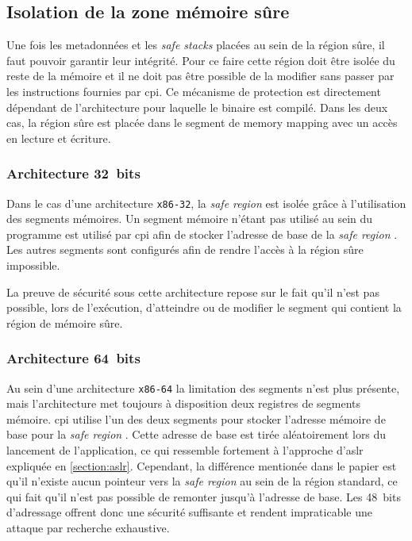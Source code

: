 \subsection{Isolation de la zone mémoire sûre}

Une fois les metadonnées et les \og \textit{safe stacks} \fg placées au sein de la région sûre, il faut pouvoir garantir leur intégrité. Pour ce faire cette région doit être isolée du reste de la mémoire et il ne doit pas être possible de la modifier sans passer par les instructions fournies par \gls{cpi}. Ce mécanisme de protection est directement dépendant de l'architecture pour laquelle le binaire est compilé. Dans les deux cas, la région sûre est placée dans le segment de \og memory mapping \fg avec un accès en lecture et écriture.

\subsubsection{Architecture 32~bits}

Dans le cas d'une architecture \texttt{x86-32}, la \og \textit{safe region} \fg est isolée grâce à l'utilisation des segments mémoires. Un segment mémoire n'étant pas utilisé au sein du programme est utilisé par \gls{cpi} afin de stocker l'adresse de base de la \og \textit{safe region} \fg. Les autres segments sont configurés afin de rendre l'accès à la région sûre impossible.


La preuve de sécurité sous cette architecture repose sur le fait qu'il n'est pas possible, lors de l'exécution, d'atteindre ou de modifier le segment qui contient la région de mémoire sûre.

\subsubsection{Architecture 64~bits}

Au sein d'une architecture \texttt{x86-64} la limitation des segments n'est plus présente, mais l'architecture met toujours à disposition deux registres de segments mémoire. \gls{cpi} utilise l'un des deux segments pour stocker l'adresse mémoire de base pour la \og \textit{safe region} \fg. Cette adresse de base est tirée aléatoirement lors du lancement de l'application, ce qui ressemble fortement à l'approche d'\gls{aslr} expliquée en \autoref{section:aslr}. Cependant, la différence mentionée dans le papier est qu'il n'existe aucun pointeur vers la \og \textit{safe region} \fg au sein de la région standard, ce qui fait qu'il n'est pas possible de remonter jusqu'à l'adresse de base. Les 48~bits d'adressage offrent donc une sécurité suffisante et rendent impraticable une attaque par recherche exhaustive.

